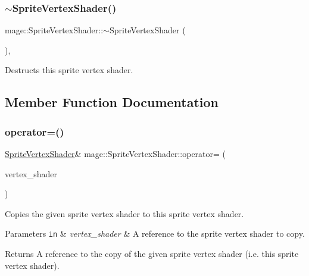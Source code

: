 \subsubsection{\texorpdfstring{$\sim$\+Sprite\+Vertex\+Shader()}{~SpriteVertexShader()}}
{\footnotesize\ttfamily mage\+::\+Sprite\+Vertex\+Shader\+::$\sim$\+Sprite\+Vertex\+Shader (\begin{DoxyParamCaption}{ }\end{DoxyParamCaption})\hspace{0.3cm}{\ttfamily [virtual]}, {\ttfamily [default]}}

Destructs this sprite vertex shader. 

\subsection{Member Function Documentation}
\hypertarget{classmage_1_1_sprite_vertex_shader_a4400ddda9637b280b7c8aedeeec6e4e7}{}\label{classmage_1_1_sprite_vertex_shader_a4400ddda9637b280b7c8aedeeec6e4e7} 
\subsubsection{\texorpdfstring{operator=()}{operator=()}\hspace{0.1cm}{\footnotesize\ttfamily [1/2]}}
{\footnotesize\ttfamily \hyperlink{classmage_1_1_sprite_vertex_shader}{Sprite\+Vertex\+Shader}\& mage\+::\+Sprite\+Vertex\+Shader\+::operator= (\begin{DoxyParamCaption}\item[{const \hyperlink{classmage_1_1_sprite_vertex_shader}{Sprite\+Vertex\+Shader} \&}]{vertex\+\_\+shader }\end{DoxyParamCaption})\hspace{0.3cm}{\ttfamily [delete]}}

Copies the given sprite vertex shader to this sprite vertex shader.


\begin{DoxyParams}[1]{Parameters}
\mbox{\tt in}  & {\em vertex\+\_\+shader} & A reference to the sprite vertex shader to copy. \\
\hline
\end{DoxyParams}
\begin{DoxyReturn}{Returns}
A reference to the copy of the given sprite vertex shader (i.\+e. this sprite vertex shader). 
\end{DoxyReturn}
\hypertarget{classmage_1_1_sprite_vertex_shader_aac64cf5df2b118ba95be72aef2bd3dca}{}\label{classmage_1_1_sprite_vertex_shader_aac64cf5df2b118ba95be72aef2bd3dca} 
